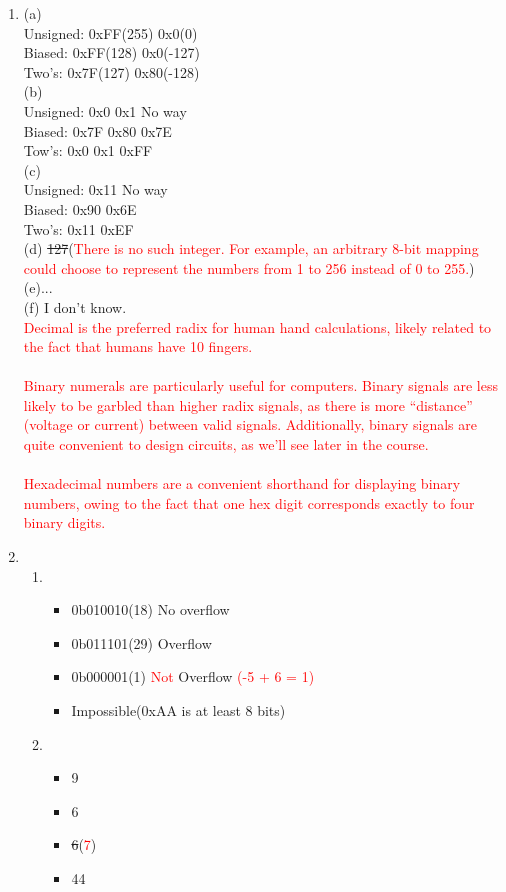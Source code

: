\documentclass[12pt,a4paper]{article}
\begin{document}
\begin{enumerate}
	\item (a)\\
	Unsigned:	0xFF(255)	0x0(0)\\
	Biased:		0xFF(128)	0x0(-127)\\
	Two's:		0x7F(127)	0x80(-128)\\
	(b)\\
	Unsigned:	0x0		0x1		No way\\
	Biased:		0x7F	0x80	0x7E\\
	Tow's:		0x0		0x1		0xFF\\
	(c)\\
	Unsigned:	0x11	No way\\
	Biased:		0x90	0x6E\\
	Two's:		0x11	0xEF\\
	(d) \sout{127}(\textcolor{red}{There is no such integer. For example, an arbitrary 8-bit mapping could choose
		to represent the numbers from 1 to 256 instead of 0 to 255.})\\
	(e)...\\
	(f) I don't know.\\\textcolor{red}{Decimal is the preferred radix for human hand calculations, likely related to
		the fact that humans have 10 fingers.\\\\
		Binary numerals are particularly useful for computers. Binary signals are
		less likely to be garbled than higher radix signals, as there is more “distance”
		(voltage or current) between valid signals. Additionally, binary signals are quite
		convenient to design circuits, as we’ll see later in the course.\\\\
		Hexadecimal numbers are a convenient shorthand for displaying binary numbers,
		owing to the fact that one hex digit corresponds exactly to four binary digits.}
	\item 
		\begin{enumerate}
		\item 
			\begin{itemize}
			\item 0b010010(18)	No overflow
			\item 0b011101(29)	Overflow
			\item 0b000001(1)	\textcolor{red}{Not }Overflow \textcolor{red}{(-5 + 6 = 1)}
			\item Impossible(0xAA is at least 8 bits)
			\end{itemize}
		\item 
			\begin{itemize}
			\item 9
			\item 6
			\item \sout{6}(\textcolor{red}{7})
			\item 44
			\end{itemize}
		\end{enumerate}
	\end{enumerate}
\end{document}
